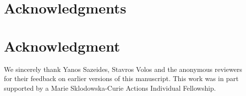 \ifCLASSOPTIONcompsoc
  \section*{Acknowledgments}
\else
  \section*{Acknowledgment}
\fi


We sincerely thank Yanos Sazeides, Stavros Volos and the anonymous reviewers for their feedback on earlier
versions of this manuscript. This work was in part supported by a Marie Sklodowska-Curie Actions Individual Fellowship.

